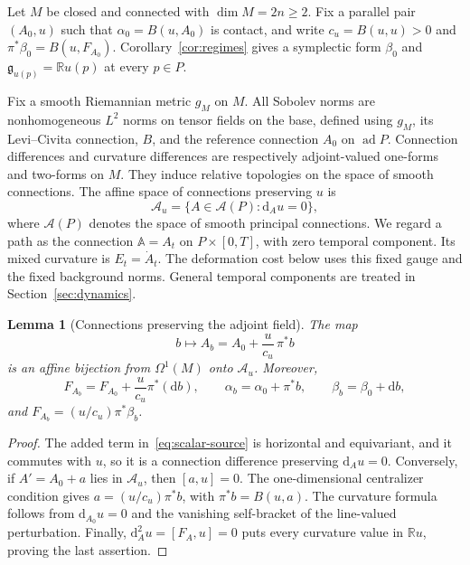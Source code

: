 \documentclass[11pt,a4paper]{article}
\numberwithin{equation}{section}
\newtheorem{lemma}[theorem]{Lemma}
\theoremstyle{definition}
\theoremstyle{remark}
\newcommand{\R}{\mathbb R}
\newcommand{\dd}{\mathrm d}
\begin{document}
Let $M$ be closed and connected with $\dim M=2n\geq2$.
Fix a parallel pair $(A_0,u)$ such that $\alpha_0=B(u,A_0)$ is contact,
and write $c_u=B(u,u)>0$ and $\pi^*\beta_0=B(u,F_{A_0})$.
Corollary~\ref{cor:regimes} gives a symplectic form $\beta_0$ and
$\mathfrak g_{u(p)}=\mathbb Ru(p)$ at every $p\in P$.

Fix a smooth Riemannian metric $g_M$ on $M$. All Sobolev norms are
nonhomogeneous $L^2$ norms on tensor fields on the base, defined using
$g_M$, its Levi--Civita connection, $B$, and the reference connection
$A_0$ on $\operatorname{ad}P$. Connection differences and curvature
differences are respectively adjoint-valued one-forms and two-forms on $M$.
They induce relative topologies on the space of smooth connections.
The affine space of connections preserving $u$ is
\[
 \mathcal A_u=\{A\in\mathcal A(P):\dd_Au=0\},
\]
where $\mathcal A(P)$ denotes the space of smooth principal connections.
We regard a path as the connection $\mathbb A=A_t$ on $P\times[0,T]$,
with zero temporal component. Its mixed curvature is $E_t=\dot A_t$.
The deformation cost below uses this fixed gauge and the fixed background
norms. General temporal components are treated in Section~\ref{sec:dynamics}.

\begin{lemma}[Connections preserving the adjoint field]\label{lem:scalar-source}
The map
\begin{equation}\label{eq:scalar-source}
 b\longmapsto A_b=A_0+\frac{u}{c_u}\,\pi^*b
\end{equation}
is an affine bijection from $\Omega^1(M)$ onto $\mathcal A_u$. Moreover,
\begin{equation}\label{eq:scalar-source-curvature}
 F_{A_b}=F_{A_0}+\frac{u}{c_u}\pi^*(\dd b),\qquad
 \alpha_b=\alpha_0+\pi^*b,\qquad
 \beta_b=\beta_0+\dd b,
\end{equation}
and $F_{A_b}=(u/c_u)\pi^*\beta_b$.
\end{lemma}

\begin{proof}
The added term in~\eqref{eq:scalar-source} is horizontal and equivariant,
and it commutes with $u$, so it is a connection difference preserving
$\dd_Au=0$. Conversely, if $A'=A_0+a$ lies in $\mathcal A_u$, then
$[a,u]=0$. The one-dimensional centralizer condition gives
$a=(u/c_u)\pi^*b$, with $\pi^*b=B(u,a)$. The curvature formula follows from
$\dd_{A_0}u=0$ and the vanishing self-bracket of the line-valued perturbation.
Finally, $\dd_A^2u=[F_A,u]=0$ puts every curvature value in $\R u$, proving
the last assertion.
\end{proof}
\end{document}
